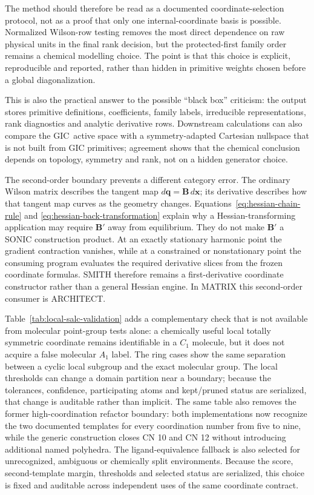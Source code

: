 \documentclass[journal=jctcce,manuscript=article,layout=traditional]{achemso}
\newcommand{\GIC}{GIC}
\newcommand{\Bmat}{\mathbf{B}}
\theoremstyle{definition}
\begin{document}
The method should therefore be read as a documented coordinate-selection
protocol, not as a proof that only one internal-coordinate basis is possible.
Normalized Wilson-row testing removes the most direct dependence on raw physical
units in the final rank decision, but the protected-first family order remains a
chemical modelling choice.  The point is that this choice is explicit,
reproducible and reported, rather than hidden in primitive weights chosen before
a global diagonalization.

This is also the practical answer to the possible ``black box'' criticism: the
output stores primitive definitions, coefficients, family labels, irreducible
representations, rank diagnostics and analytic derivative rows.  Downstream
calculations can also compare the \GIC\ active space with a symmetry-adapted
Cartesian nullspace that is not built from GIC primitives; agreement shows that
the chemical conclusion depends on topology, symmetry and rank, not on a hidden
generator choice.

The second-order boundary prevents a different category error.  The ordinary
Wilson matrix describes the tangent map
\(d\mathbf q=\Bmat\,d\mathbf x\); its derivative describes how that tangent map
curves as the geometry changes.  Equations~\eqref{eq:hessian-chain-rule} and
\eqref{eq:hessian-back-transformation} explain why a Hessian-transforming
application may require \(\Bmat'\) away from equilibrium.  They do not make
\(\Bmat'\) a SONIC construction product.  At an exactly stationary harmonic
point the gradient contraction vanishes, while at a constrained or
nonstationary point the consuming program evaluates the required derivative
slices from the frozen coordinate formulas.  SMITH therefore remains a
first-derivative coordinate constructor rather than a general Hessian engine.
In MATRIX this second-order consumer is ARCHITECT.

Table~\ref{tab:local-salc-validation} adds a complementary check that is not
available from molecular point-group tests alone: a chemically useful local
totally symmetric coordinate remains identifiable in a \(C_1\) molecule, but
it does not acquire a false molecular \(A_1\) label.  The ring cases show the
same separation between a cyclic local subgroup and the exact molecular group.
The local thresholds can change a domain partition near a boundary; because
the tolerances, confidence, participating atoms and kept/pruned status are
serialized, that change is auditable rather than implicit.
The same table also removes the former high-coordination refactor boundary:
both implementations now recognize the two documented templates for every
coordination number from five to nine, while the generic construction closes
CN 10 and CN 12 without introducing additional named polyhedra.  The
ligand-equivalence fallback is also selected for unrecognized, ambiguous or
chemically split environments.  Because the score, second-template margin,
thresholds and selected status are serialized, this choice is fixed and
auditable across independent uses of the same coordinate contract.
\end{document}
